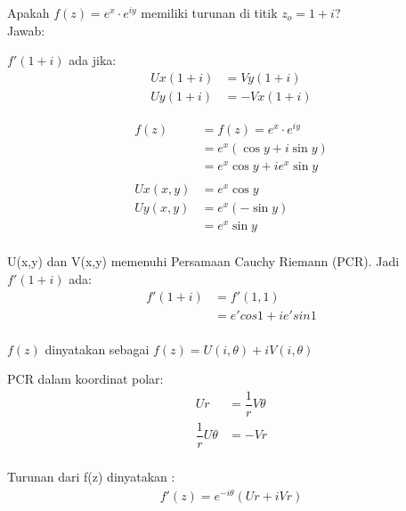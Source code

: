 \documentclass{article}
\begin{document}
Apakah $f(z)=e^x \cdot e^{iy}$ memiliki turunan di titik $z_o = 1+i$?\\

Jawab:

$f'(1+i)$ ada jika:
\begin{align}
    Ux(1+i) & = Vy(1+i)
    \nonumber            \\
    Uy(1+i) & = -Vx(1+i)
    \nonumber
\end{align}

\begin{align}
    f(z)    & = f(z)=e^x \cdot e^{iy}
    \nonumber                             \\
            & = e^x(\cos y + i \sin y)
    \nonumber                             \\
            & = e^x \cos y + i e^x \sin y
    \nonumber                             \\
    \nonumber                             \\
    Ux(x,y) & = e^x \cos y
    \nonumber                             \\
    Uy(x,y) & = e^x (-\sin y)
    \nonumber                             \\
            & = e^x \sin y
    \nonumber                             \\
    \nonumber
\end{align}

U(x,y) dan V(x,y) memenuhi Persamaan Cauchy Riemann (PCR). Jadi $f'(1+i)$ ada:
\begin{align}
    f'(1+i) & = f'(1,1)
    \nonumber                       \\
            & = e'cos 1 + i e'sin 1
    \nonumber                       \\
    \nonumber
\end{align}


$f(z)$ dinyatakan sebagai $f(z) = U(i,\theta)+ iV(i,\theta)$

PCR dalam koordinat polar:
\begin{align}
    Ur                  & = \dfrac{1}{r}V\theta
    \nonumber                                   \\
    \dfrac{1}{r}U\theta & = -Vr
    \nonumber                                   \\
    \nonumber
\end{align}

Turunan dari f(z) dinyatakan :
\begin{align}
    f'(z) = e^{-i\theta}(Ur+iVr)
\end{align}
\end{document}
